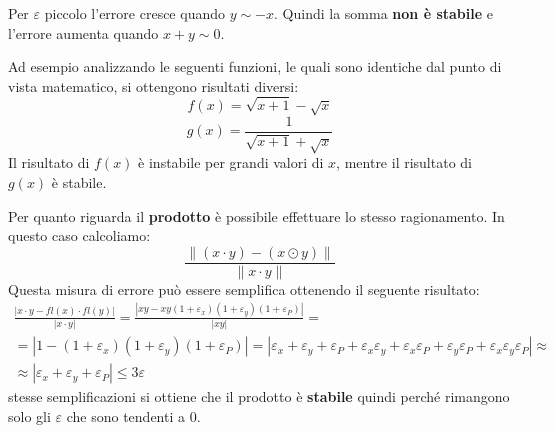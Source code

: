 Per $\varepsilon$ piccolo l'errore cresce quando $y \sim -x$. Quindi la somma
\textbf{non è stabile} e l'errore aumenta quando $x + y \sim 0$.
\begin{esempio}
    Ad esempio analizzando le seguenti funzioni, le quali sono identiche dal 
    punto di vista matematico, si ottengono risultati diversi:
    \begin{equation*}
        f(x) = \sqrt{x + 1} - \sqrt{x}
    \end{equation*}
    \begin{equation*}
        g(x) = \frac{1}{\sqrt{x + 1} + \sqrt{x}}
    \end{equation*}
    Il risultato di $f(x)$ è instabile per grandi valori di $x$, mentre il 
    risultato di $g(x)$ è stabile.
\end{esempio}
Per quanto riguarda il \textbf{prodotto} è possibile effettuare lo stesso
ragionamento. In questo caso calcoliamo:
\begin{equation}
    \frac{\|(x\cdot y)-(x\odot y)\|}{\|x\cdot y\|}
\end{equation}
Questa misura di errore può essere semplifica ottenendo il seguente risultato:
\begin{equation}
    \begin{aligned}
        \frac{|x \cdot y - fl(x) \cdot fl(y)|}{|x \cdot y|} = \frac{|xy - xy(1 + 
        \varepsilon_x)(1 + \varepsilon_y)(1 + \varepsilon_P)|}{|xy|} = \\
        = |1 - (1 + \varepsilon_x)(1 + \varepsilon_y)(1 + \varepsilon_P)| = 
        |\varepsilon_x + \varepsilon_y + \varepsilon_P + \varepsilon_x \varepsilon_y + \varepsilon_x \varepsilon_P + \varepsilon_y \varepsilon_P + \varepsilon_x \varepsilon_y \varepsilon_P| \approx \\
        \approx |\varepsilon_x + \varepsilon_y + \varepsilon_P| \leq 3\varepsilon
    \end{aligned}
\end{equation}
stesse semplificazioni si ottiene che il prodotto è \textbf{stabile} quindi perché
rimangono solo gli $\varepsilon$ che sono tendenti a $0$.